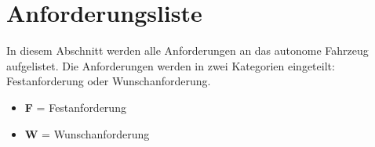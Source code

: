 \documentclass[../main.tex]{subfiles}
\begin{document}
\newpage
\section{Anforderungsliste}
\label{sec:anforderungsliste}

In diesem Abschnitt werden alle Anforderungen an das autonome Fahrzeug aufgelistet.  
Die Anforderungen werden in zwei Kategorien eingeteilt: Festanforderung oder Wunschanforderung.  

\begin{multicols}{2}
\begin{itemize}
  \item {\bf F} = Festanforderung
  \item {\bf W} = Wunschanforderung
\end{itemize}

\columnbreak


\end{multicols}
\end{document}
